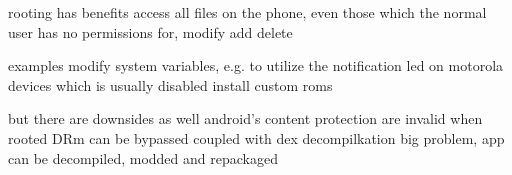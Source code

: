rooting has benefits
access all files on the phone, even those which the normal user has no permissions for, modify add delete

examples
modify system variables, e.g. to utilize the notification led on motorola devices which is usually disabled
install custom roms

but there are downsides as well
android's content protection are invalid when rooted
DRm can be bypassed
coupled with dex decompilkation big problem, app can be decompiled, modded and repackaged\cite{levinAndevcon}

%

%
%


%

